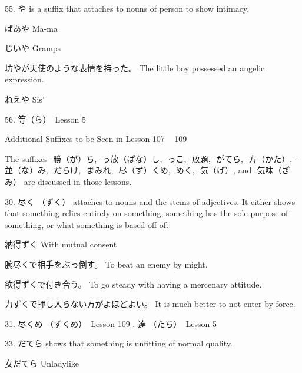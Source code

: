 \par{55. や is a suffix that attaches to nouns of person to show intimacy. }

\par{ばあや \hfill\break
Ma-ma }

\par{じいや \hfill\break
Gramps }

\par{坊やが天使のような表情を持った。 \hfill\break
The little boy possessed an angelic expression. }

\par{ねえや \hfill\break
Sis' }

\par{56. 等（ら）　\textrightarrow  Lesson 5  \hfill\break
}

\par{Additional Suffixes to be Seen in Lesson 107  ~  109  }

\par{The suffixes -勝（が）ち, -っ放（ぱな）し, -っこ, -放題, -がてら, -方（かた）, -並（な）み, -だらけ, -まみれ, -尽（ず）くめ, -めく, -気（げ）, and -気味（ぎみ） are discussed in those lessons. }

\par{30. 尽く （ずく） attaches to nouns and the stems of adjectives. It either shows that something relies entirely on something, something has the sole purpose of something, or what something is based off of. }

\par{納得ずく \hfill\break
With mutual consent }

\par{腕尽くで相手をぶっ倒す。 \hfill\break
To beat an enemy by might. }

\par{欲得ずくで付き合う。 \hfill\break
To go steady with having a mercenary attitude. }

\par{力ずくで押し入らない方がよほどよい。 \hfill\break
It is much better to not enter by force. }

\par{31. 尽くめ （ずくめ）　\textrightarrow  Lesson 109  \hfill{}. 達 （たち）　\textrightarrow  Lesson 5  }

\par{33. だてら shows that something is unfitting of normal quality. }

\par{女だてら \hfill\break
Unladylike }

